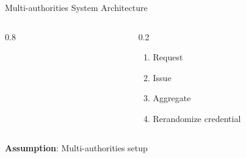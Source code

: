 \begin{frame}{Multi-authorities System Architecture}
    \vspace{-5mm}
    \centering
    \begin{columns}
        \begin{column}{0.8\linewidth}
            \begin{figure}%
                \resizebox{\linewidth}{!}{}
            \end{figure} 
        \end{column}
        \begin{column}{0.2\linewidth}
            \vspace{10mm}
            \begin{enumerate}
                \item[(1)] Request %
                \item[(2)] Issue %
                \item[(3)] Aggregate %
                \item[(4)] Rerandomize credential
            \end{enumerate}
        \end{column}
    \end{columns}

    \vspace{10mm}
    \normalsize
    \textbf{Assumption}: {\color{Cerulean}Multi-authorities \color{black}setup}
\end{frame}


